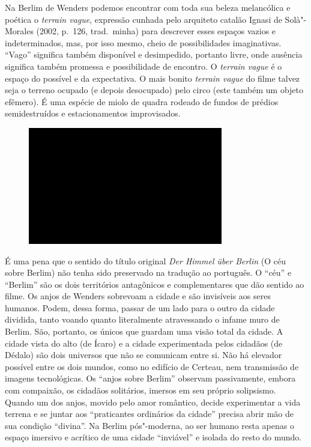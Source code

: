 Na Berlim de Wenders podemos encontrar com toda sua beleza melancólica e
poética o \emph{terrain vague}, expressão cunhada pelo arquiteto catalão
Ignasi de Solà"-Morales (2002, p.~126, trad.~minha) para descrever esses
espaços vazios e indeterminados, mas, por isso mesmo, cheio de
possibilidades imaginativas. ``Vago'' significa também disponível e
desimpedido, portanto livre, onde ausência significa também promessa e
possibilidade de encontro. O \emph{terrain vague} é o espaço do
possível e da expectativa. O mais bonito \emph{terrain vague} do filme
talvez seja o terreno ocupado (e depois desocupado) pelo circo (este
também um objeto efêmero). É uma espécie de miolo de quadra rodeado de
fundos de prédios semidestruídos e estacionamentos improvisados.

\begin{figure}[!ht]

\centering
 \includegraphics[width=85mm]{./imgs/im1.jpg}
\caption{\tiny{}}

\end{figure}

É uma pena que o sentido do título original \emph{Der Himmel über
Berlin} (O céu sobre Berlim) não tenha sido preservado na tradução ao
português. O ``céu'' e ``Berlim'' são os dois territórios antagônicos e
complementares que dão sentido ao filme. Os anjos de Wenders sobrevoam a
cidade e são invisíveis aos seres humanos. Podem, dessa forma, passar de
um lado para o outro da cidade dividida, tanto voando quanto
literalmente atravessando o infame muro de Berlim. São, portanto, os
únicos que guardam uma visão total da cidade. A cidade vista do alto (de
Ícaro) e a cidade experimentada pelos cidadãos (de Dédalo) são dois
universos que não se comunicam entre si. Não há elevador possível entre
os dois mundos, como no edifício de Certeau, nem transmissão de imagens
tecnológicas. Os ``anjos sobre Berlim'' observam passivamente, embora
com compaixão, os cidadãos solitários, imersos em seu próprio
solipsismo. Quando um dos anjos, movido pelo amor romântico, decide
experimentar a vida terrena e se juntar aos ``praticantes ordinários da
cidade'' precisa abrir mão de sua condição ``divina''. Na Berlim
pós"-moderna, ao ser humano resta apenas o espaço imersivo e acrítico de
uma cidade ``inviável'' e isolada do resto do mundo.

